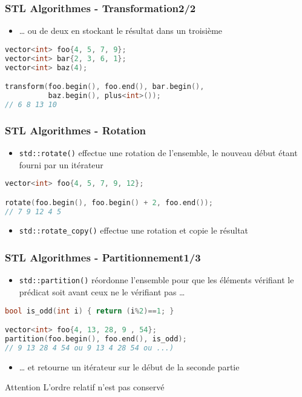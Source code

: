 \documentclass[C++.tex]{subfiles}
\begin{document}
\begin{frame}[fragile]
	\frametitle{STL Algorithmes - Transformation\titlehfill{}2/2}
	\begin{itemize}
		\item \ldots{} ou de deux en stockant le résultat dans un troisième
	\end{itemize}

	\begin{lstlisting}[language=C++]
vector<int> foo{4, 5, 7, 9};
vector<int> bar{2, 3, 6, 1};
vector<int> baz(4);

transform(foo.begin(), foo.end(), bar.begin(), 
          baz.begin(), plus<int>());
// 6 8 13 10\end{lstlisting}
\end{frame}

\begin{frame}[fragile]
	\frametitle{STL Algorithmes - Rotation}
	\begin{itemize}
		\item \lstinline|std::rotate()| effectue une rotation de l'ensemble, le nouveau début étant fourni par un itérateur
	\end{itemize}

	\begin{lstlisting}[language=C++]
vector<int> foo{4, 5, 7, 9, 12};

rotate(foo.begin(), foo.begin() + 2, foo.end());
// 7 9 12 4 5\end{lstlisting}

	\begin{itemize}
		\item \lstinline|std::rotate_copy()| effectue une rotation et copie le résultat
	\end{itemize}
\end{frame}

\begin{frame}[fragile]
	\frametitle{STL Algorithmes - Partitionnement\titlehfill{}1/3}
	\begin{itemize}
		\item \lstinline|std::partition()| réordonne l'ensemble pour que les éléments vérifiant le prédicat soit avant ceux ne le vérifiant pas \ldots
	\end{itemize}

	\begin{lstlisting}[language=C++]
bool is_odd(int i) { return (i%2)==1; }

vector<int> foo{4, 13, 28, 9 , 54};
partition(foo.begin(), foo.end(), is_odd);
// 9 13 28 4 54 ou 9 13 4 28 54 ou ...)\end{lstlisting}


	\begin{itemize}
		\item \ldots{} et retourne un itérateur sur le début de la seconde partie
	\end{itemize}

	\begin{alertblock}{Attention}
		L'ordre relatif n'est pas conservé
	\end{alertblock}
\end{frame}
\end{document}
